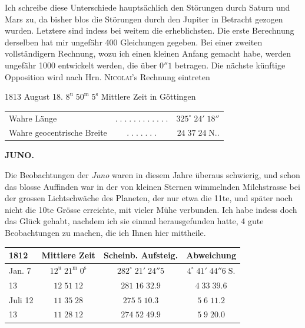 \par\indent Ich schreibe diese Unterschiede hauptsächlich den Störungen durch Saturn
und Mars zu, da bisher blos die Störungen durch den Jupiter in Betracht
gezogen wurden. Letztere sind indess bei weitem die erheblichsten. Die
erste Berechnung derselben hat mir ungefähr 400 Gleichungen gegeben. Bei
einer zweiten vollständigern Rechnung, wozu ich einen kleinen Anfang
gemacht habe, werden ungefähr 1000 entwickelt werden, die über $0''1$
betragen. Die nächste künftige Opposition wird nach Hrn. \textsc{Nicolai}'s
Rechnung eintreten

1813 August 18. $8^{\mathrm u}\;50^{\mathrm m}\;5^{\mathrm s}$ Mittlere Zeit in Göttingen

\begin{center}\fontsize{10}{12}\selectfont\setlength{\tabcolsep}{2pt}\renewcommand{\arraystretch}{1.15}\begin{tabular}{lcr}
Wahre Länge & $.\;.\;.\;.\;.\;.\;.\;.\;.\;.\;.\;.$ & $325^\circ\;24'\;18''$\\
Wahre geocentrische Breite & $.\;.\;.\;.\;.\;.\;.$ & $24\;37\;24\;\mathrm{N}..$\\
\end{tabular}\end{center}

\clearpage
\thispagestyle{empty}
\noindent{}%
\makebox[12mm][l]{}%
\parbox[t]{\dimexpr\linewidth-24mm\relax}{\centering\footnotesize\bfseries JUNO.\par}%
\par\nobreak\medskip
\par\indent Die Beobachtungen der \emph{Juno} waren in diesem Jahre überaus schwierig,
und schon das blosse Auffinden war in der von kleinen Sternen wimmelnden
Milchstrasse bei der grossen Lichtschwäche des Planeten, der nur etwa die
11te, und später noch nicht die 10te Grösse erreichte, mit vieler Mühe
verbunden. Ich habe indess doch das Glück gehabt, nachdem ich sie einmal
herausgefunden hatte, 4 gute Beobachtungen zu machen, die ich Ihnen hier
mittheile.

\begin{center}\fontsize{10}{12}\selectfont\setlength{\tabcolsep}{4pt}\renewcommand{\arraystretch}{1.15}\begin{tabular}{l|c|c|c}
1812 & Mittlere Zeit & Scheinb. Aufsteig. & Abweichung\\\hline
Jan. 7 & $12^{\mathrm u}\;21^{\mathrm m}\;0^{\mathrm s}$ & $282^\circ\;21'\;24''5$ & $4^\circ\;41'\;44''6\;\mathrm S.$\\
13 & $12\;51\;12$ & $281\;16\;32.9$ & $4\;33\;39.6$\\
Juli 12 & $11\;35\;28$ & $275\;5\;10.3$ & $5\;6\;11.2$\\
13 & $11\;28\;12$ & $274\;52\;49.9$ & $5\;9\;20.0$\\
\end{tabular}\end{center}


